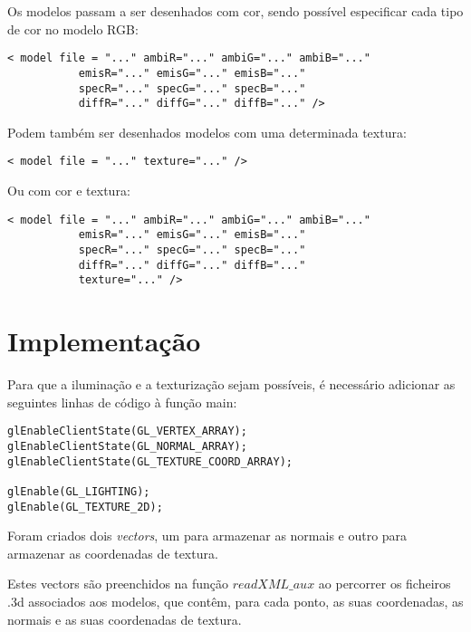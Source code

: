 \documentclass[11pt,a4paper]{report}
\begin{document}
\iffalse 
Para todos os tipos de luzes enunciados a cima podem especificar a intensidade RGB das luzes no que toca à componente difusa, ambiente e especular, assim:
\begin{lstlisting}[style = xml]
<light ... ambiR="..." ambiG="..." ambiB="..."
           specR="..." specG="..." specB="..."
           diffR="..." diffG="..." diffB="..." />
\end{lstlisting}
\fi

Os modelos passam a ser desenhados com cor, sendo possível especificar cada tipo de cor no modelo RGB:
\begin{lstlisting}[style = xml]
< model file = "..." ambiR="..." ambiG="..." ambiB="..."
		   emisR="..." emisG="..." emisB="..."
           specR="..." specG="..." specB="..."
           diffR="..." diffG="..." diffB="..." />
\end{lstlisting}

Podem também ser desenhados modelos com uma determinada textura:
\begin{lstlisting}[style = xml]
< model file = "..." texture="..." />
\end{lstlisting}

Ou com cor e textura:
\begin{lstlisting}[style = xml]
< model file = "..." ambiR="..." ambiG="..." ambiB="..."
		   emisR="..." emisG="..." emisB="..."
           specR="..." specG="..." specB="..."
           diffR="..." diffG="..." diffB="..."
		   texture="..." />
\end{lstlisting}

\section{Implementação}
Para que a iluminação e a texturização sejam possíveis, é necessário adicionar as seguintes linhas de código à função main:

\begin{lstlisting}[style = code]
glEnableClientState(GL_VERTEX_ARRAY);
glEnableClientState(GL_NORMAL_ARRAY);
glEnableClientState(GL_TEXTURE_COORD_ARRAY);

glEnable(GL_LIGHTING);
glEnable(GL_TEXTURE_2D);
\end{lstlisting}

Foram criados dois \emph{vectors}, um para armazenar as normais e outro para armazenar as coordenadas de textura.

Estes vectors são preenchidos na função {$readXML\_aux$} ao percorrer os ficheiros .3d associados aos modelos, que contêm, para cada ponto, as suas coordenadas, as normais e as suas coordenadas de textura.
\end{document}
